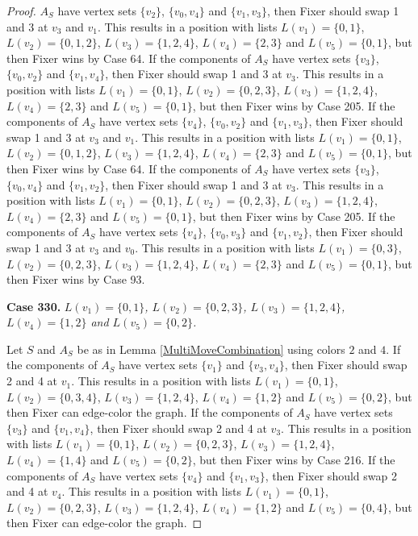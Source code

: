 \documentclass[12pt]{amsart}
\theoremstyle{plain}
\theoremstyle{definition}
\theoremstyle{remark}
\begin{document}
\begin{proof}
$A_S$ have vertex sets $\{v_2\}$, $\{v_0, v_4\}$ and $\{v_1, v_3\}$, then Fixer should swap 1 and 3 at $v_3$ and $v_1$. This results in a position with lists $L(v_1) = \{0, 1\}$, $L(v_2) = \{0, 1, 2\}$, $L(v_3) = \{1, 2, 4\}$, $L(v_4) = \{2, 3\}$ and $L(v_5) = \{0, 1\}$, but then Fixer wins by Case 64. If the components of $A_S$ have vertex sets $\{v_3\}$, $\{v_0, v_2\}$ and $\{v_1, v_4\}$, then Fixer should swap 1 and 3 at $v_3$. This results in a position with lists $L(v_1) = \{0, 1\}$, $L(v_2) = \{0, 2, 3\}$, $L(v_3) = \{1, 2, 4\}$, $L(v_4) = \{2, 3\}$ and $L(v_5) = \{0, 1\}$, but then Fixer wins by Case 205. If the components of $A_S$ have vertex sets $\{v_4\}$, $\{v_0, v_2\}$ and $\{v_1, v_3\}$, then Fixer should swap 1 and 3 at $v_3$ and $v_1$. This results in a position with lists $L(v_1) = \{0, 1\}$, $L(v_2) = \{0, 1, 2\}$, $L(v_3) = \{1, 2, 4\}$, $L(v_4) = \{2, 3\}$ and $L(v_5) = \{0, 1\}$, but then Fixer wins by Case 64. If the components of $A_S$ have vertex sets $\{v_3\}$, $\{v_0, v_4\}$ and $\{v_1, v_2\}$, then Fixer should swap 1 and 3 at $v_3$. This results in a position with lists $L(v_1) = \{0, 1\}$, $L(v_2) = \{0, 2, 3\}$, $L(v_3) = \{1, 2, 4\}$, $L(v_4) = \{2, 3\}$ and $L(v_5) = \{0, 1\}$, but then Fixer wins by Case 205. If the components of $A_S$ have vertex sets $\{v_4\}$, $\{v_0, v_3\}$ and $\{v_1, v_2\}$, then Fixer should swap 1 and 3 at $v_3$ and $v_0$. This results in a position with lists $L(v_1) = \{0, 3\}$, $L(v_2) = \{0, 2, 3\}$, $L(v_3) = \{1, 2, 4\}$, $L(v_4) = \{2, 3\}$ and $L(v_5) = \{0, 1\}$, but then Fixer wins by Case 93. 

\noindent\textbf{Case 330.  }\textit{$L(v_1) = \{0, 1\}$, $L(v_2) = \{0, 2, 3\}$, $L(v_3) = \{1, 2, 4\}$, $L(v_4) = \{1, 2\}$ and $L(v_5) = \{0, 2\}$.}

Let $S$ and $A_S$ be as in Lemma \ref{MultiMoveCombination} using colors $2$ and $4$. If the components of $A_S$ have vertex sets $\{v_1\}$ and $\{v_3, v_4\}$, then Fixer should swap 2 and 4 at $v_1$. This results in a position with lists $L(v_1) = \{0, 1\}$, $L(v_2) = \{0, 3, 4\}$, $L(v_3) = \{1, 2, 4\}$, $L(v_4) = \{1, 2\}$ and $L(v_5) = \{0, 2\}$, but then Fixer can edge-color the graph. If the components of $A_S$ have vertex sets $\{v_3\}$ and $\{v_1, v_4\}$, then Fixer should swap 2 and 4 at $v_3$. This results in a position with lists $L(v_1) = \{0, 1\}$, $L(v_2) = \{0, 2, 3\}$, $L(v_3) = \{1, 2, 4\}$, $L(v_4) = \{1, 4\}$ and $L(v_5) = \{0, 2\}$, but then Fixer wins by Case 216. If the components of $A_S$ have vertex sets $\{v_4\}$ and $\{v_1, v_3\}$, then Fixer should swap 2 and 4 at $v_4$. This results in a position with lists $L(v_1) = \{0, 1\}$, $L(v_2) = \{0, 2, 3\}$, $L(v_3) = \{1, 2, 4\}$, $L(v_4) = \{1, 2\}$ and $L(v_5) = \{0, 4\}$, but then Fixer can edge-color the graph. 


\end{proof}
\end{document}
